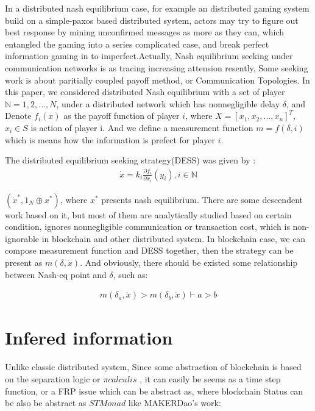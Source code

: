 \documentclass[twocolumn]{article}
\begin{document}
In a distributed nash equilibrium case, for example an distributed gaming system build on a simple-paxos based distributed system, actors may try to figure out best response by mining unconfirmed messages as more as they can, which entangled the gaming into a series complicated case, and break perfect information gaming in to imperfect.Actually, Nash equilibrium seeking under communication networks is as tracing increasing attension resently, Some seeking work is about paritially coupled payoff method\cite{8029164}, or Communication Topologies\cite{8093754}. In this paper, we considered distributed Nash equilibrium with a set of player $\mathbb{N} = {1, 2, ..., N}$, under a distributed network which has nonnegligible delay $\mathbb{\delta}$, and Denote $f_i(x)$ as the payoff function of player $i$, where $X = [x_1, x_2, ..., x_n]^T$, $x_i \in S$ is action of player i. And we define a measurement function $m = f(\delta, i)$ which is means how the information is prefect for player $i$.

The distributed equilibrium seeking strategy(DESS) was given by \cite{7888532}:
\begin{gather}
  \dot{x} = k_i \frac {\partial f_i}{\partial x_i}(y_i), i \in \mathbb{N}
\end{gather}

$(\dot{x}^*, 1_N\oplus x^*)$, where $x^*$ presents nash equilibrium. There are some descendent work based on it, but most of them are analytically studied based on certain condition, ignores nonnegligible communication or transaction cost, which is non-ignorable in blockchain and other distributed system. In blockchain case, we can compose measurement function and DESS together, then the strategy can be present as $m(\delta, \dot{x})$. And obviously, there should be existed some relationship between Nash-eq point and $\delta$, such as:

\begin{gather}
  m(\delta_a, \dot{x}) > m(\delta_b, \dot{x}) \vdash a > b
\end{gather}

\section{Infered information}

Unlike classic distributed system,
Since some abstraction of blockchain is based on the separation logic or $\pi calculis$ \cite{linearblockchain}, it can easily be seems as a time step function, or a FRP issue which can be abstract as\cite{ElliottHudak97:Fran}, where blockchain Status can be also be abstract as $STMonad$ like MAKERDao\cite{dai}'s work:
\end{document}
